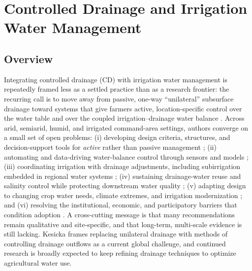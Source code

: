 \documentclass[11pt]{article}
\begin{document}
\section*{Controlled Drainage and Irrigation Water Management}

\subsection{Overview}
Integrating controlled drainage (CD) with irrigation water management is repeatedly framed less as a settled practice than as a research frontier: the recurring call is to move away from passive, one-way ``unilateral'' subsurface drainage toward systems that give farmers active, location-specific control over the water table and over the coupled irrigation--drainage water balance \parencite{Ayars2006b,Kesicka2023b,Ritzema2023}. Across arid, semiarid, humid, and irrigated command-area settings, authors converge on a small set of open problems: (i) developing design criteria, structures, and decision-support tools for \emph{active} rather than passive management \parencite{Ayars2006b,Youssef2023,Saadat2017}; (ii) automating and data-driving water-balance control through sensors and models \parencite{Youssef2023,Ikonen2023,Isomäki2024}; (iii) coordinating irrigation with drainage adjustments, including subirrigation embedded in regional water systems \parencite{Wahba2005,deWit2022,deWit2024}; (iv) sustaining drainage-water reuse and salinity control while protecting downstream water quality \parencite{WESTCOT1988,Sharma1998,Ayars2015}; (v) adapting design to changing crop water needs, climate extremes, and irrigation modernization \parencite{Rui2024,Ritzema2007,Ziaeifar2025}; and (vi) resolving the institutional, economic, and participatory barriers that condition adoption \parencite{Ritzema2011,Castellano2019,Qureshi2008}. A cross-cutting message is that many recommendations remain qualitative and site-specific, and that long-term, multi-scale evidence is still lacking. Kesicka \textcite{Kesicka2023b} frames replacing unilateral drainage with methods of controlling drainage outflows as a current global challenge, and continued research is broadly expected to keep refining drainage techniques to optimize agricultural water use.
\end{document}
